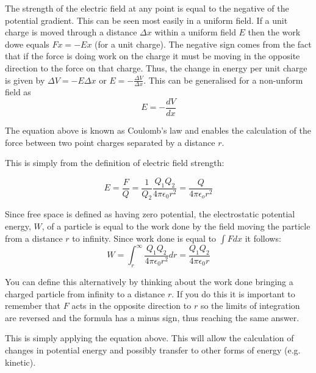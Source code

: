 \documentclass[revision-guide.tex]{subfiles}
\begin{document}

The strength of the electric field at any point is equal to the negative of the potential gradient. This can be seen most easily in a uniform field. If a unit charge is moved through a distance $\Delta x$ within a uniform field $E$ then the work dowe equals $Fx = -Ex$ (for a unit charge). The negative sign comes from the fact that if the force is doing work on the charge it must be moving in the opposite direction to the force on that charge. Thus, the change in energy per unit charge is given by $\Delta V = -E\Delta x$ or $E = -\frac{\Delta V}{\Delta x}$. This can be generalised for a non-unform field as
\[ E = - \frac{dV}{dx} \]


The equation above is known as Coulomb's law and enables the calculation of the force between two point charges separated by a distance $r$.


This is simply from the definition of electric field strength:

\[ E = \frac{F}{Q} = \frac{1}{Q_2} \frac{Q_1 Q_2}{4\pi\epsilon_0 r^2} = \frac{Q}{4\pi\epsilon_o r^2} \]


Since free space is defined as having zero potential, the electrostatic potential energy, $W$, of a particle is equal to the work done by the field moving the particle from a distance $r$ to infinity. Since work done is equal to $\int F dx$ it follows:
\[ W = \int_{r}^\infty \frac{Q_1 Q_2}{4\pi\epsilon_0 r^2} dr = \frac{Q_1 Q_2}{4\pi\epsilon_0 r}\]

You can define this alternatively by thinking about the work done bringing a charged particle from infinity to a distance $r$. If you do this it is important to remember that $F$ acts in the opposite direction to $r$ so the limits of integration are reversed and the formula has a minus sign, thus reaching the same answer.


This is simply applying the equation above. This will allow the calculation of changes in potential energy and possibly transfer to other forms of energy (e.g. kinetic).
\end{document}
